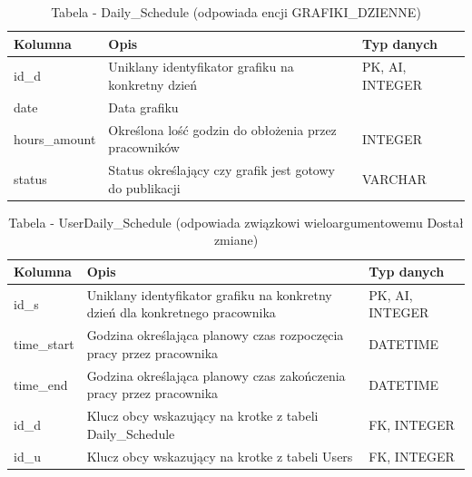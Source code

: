\begin{table}[h!]
    \centering
    \begin{tabular}{|p{3cm}|p{6cm}|p{4cm}|}
    \hline
    \textbf{Kolumna} & \textbf{Opis} & \textbf{Typ danych} \\ \hline
    id\_d & Uniklany identyfikator grafiku na konkretny dzień & PK, AI, INTEGER \\ \hline
    date & Data grafiku & \\ \hline
    hours\_amount & Określona lość godzin do obłożenia przez pracowników  &  INTEGER\\ \hline
    status & Status określający czy grafik jest gotowy do publikacji & VARCHAR \\ \hline
    \end{tabular}
    \caption{Tabela - Daily\_Schedule (odpowiada encji GRAFIKI\_DZIENNE)}
\end{table}

\begin{table}[h!]
    \centering
    \begin{tabular}{|p{3cm}|p{6cm}|p{4cm}|}
    \hline
    \textbf{Kolumna} & \textbf{Opis} & \textbf{Typ danych} \\ \hline
    id\_s & Uniklany identyfikator grafiku na konkretny dzień dla konkretnego pracownika & PK, AI, INTEGER \\ \hline
    time\_start & Godzina określająca planowy czas rozpoczęcia pracy przez pracownika & DATETIME \\ \hline
    time\_end & Godzina określająca planowy czas zakończenia pracy przez pracownika & DATETIME\\ \hline
    id\_d & Klucz obcy wskazujący na krotke z tabeli Daily\_Schedule & FK, INTEGER\\ \hline
    id\_u & Klucz obcy wskazujący na krotke z tabeli Users & FK, INTEGER\\ \hline
    \end{tabular}
    \caption{Tabela - UserDaily\_Schedule (odpowiada związkowi wieloargumentowemu Dostał zmiane)}
\end{table}
